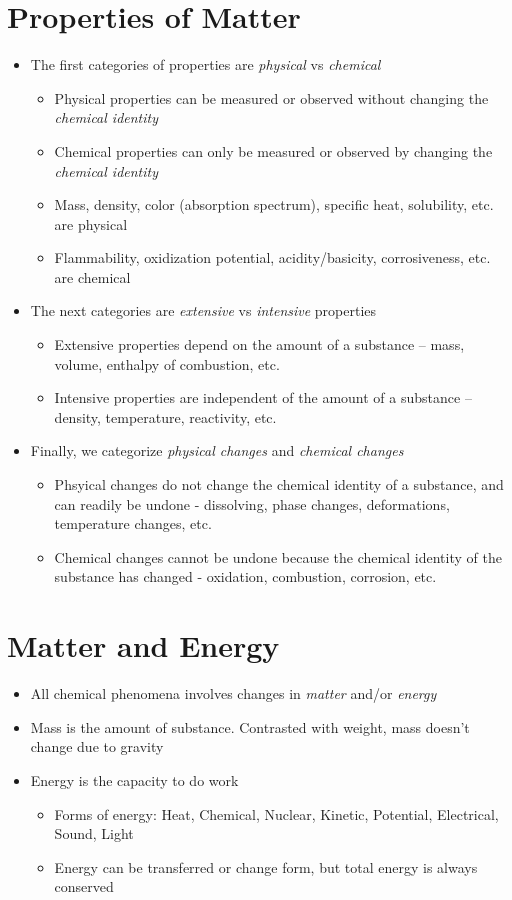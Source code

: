 \documentclass[12pt, openany, letterpaper]{memoir}
\begin{document}
\section{Properties of Matter}
\begin{itemize}
	\item The first categories of properties are \emph{physical} vs \emph{chemical}
	      \begin{itemize}
		      \item Physical properties can be measured or observed without changing the \emph{chemical identity}
		      \item Chemical properties can only be measured or observed by changing the \emph{chemical identity}
		      \item Mass, density, color (absorption spectrum), specific heat, solubility, etc. are physical
		      \item Flammability, oxidization potential, acidity/basicity, corrosiveness, etc. are chemical
	      \end{itemize}
	\item The next categories are \emph{extensive} vs \emph{intensive} properties
	      \begin{itemize}
		      \item Extensive properties depend on the amount of a substance -- mass, volume, enthalpy of combustion, etc.
		      \item Intensive properties are independent of the amount of a substance -- density, temperature, reactivity, etc.
	      \end{itemize}
	\item Finally, we categorize \emph{physical changes} and \emph{chemical changes}
	      \begin{itemize}
		      \item Phsyical changes do not change the chemical identity of a substance, and can readily be undone - dissolving, phase changes, deformations, temperature changes, etc.
		      \item Chemical changes cannot be undone because the chemical identity of the substance has changed - oxidation, combustion, corrosion, etc.
	      \end{itemize}
\end{itemize}
\section{Matter and Energy}
\begin{itemize}
	\item All chemical phenomena involves changes in \emph{matter} and/or \emph{energy}
	\item Mass is the amount of substance. Contrasted with weight, mass doesn't change due to gravity
	\item Energy is the capacity to do work
	      \begin{itemize}
		      \item Forms of energy: Heat, Chemical, Nuclear, Kinetic, Potential, Electrical, Sound, Light
		      \item Energy can be transferred or change form, but total energy is always conserved
	      \end{itemize}
\end{itemize}
\end{document}
